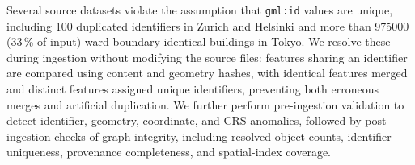 \documentclass[sigconf,authordraft]{acmart}
\newcommand{\mytoolname}{\textit{pykci}}
\begin{document}
Several source datasets violate the assumption that \texttt{gml:id} values are unique, including 100 duplicated identifiers in Zurich and Helsinki and more than \num{975000} (33\,\% of input) ward-boundary identical buildings in Tokyo. 
We resolve these during ingestion without modifying the source files: features sharing an identifier are compared using content and geometry hashes, with identical features merged and distinct features assigned unique identifiers, preventing both erroneous merges and artificial duplication. We further perform pre-ingestion validation to detect identifier, geometry, coordinate, and CRS anomalies, followed by post-ingestion checks of graph integrity, including resolved object counts, identifier uniqueness, provenance completeness, and spatial-index coverage. 
\end{document}
